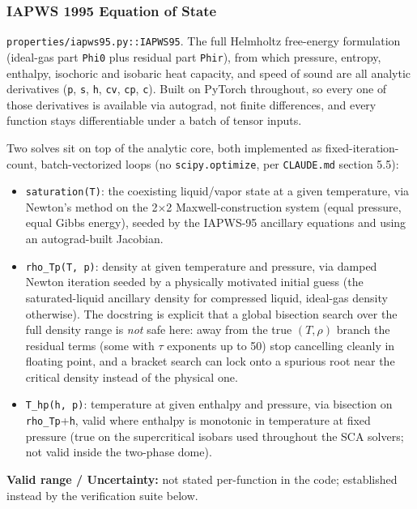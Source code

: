 \documentclass[11pt]{article}
\newcommand{\code}[1]{\texttt{#1}}
\begin{document}
\subsubsection{IAPWS 1995 Equation of State}

\code{properties/iapws95.py::IAPWS95}. The full Helmholtz free-energy formulation
(ideal-gas part \code{Phi0} plus residual part \code{Phir}), from which pressure,
entropy, enthalpy, isochoric and isobaric heat capacity, and speed of sound are all
analytic derivatives (\code{p}, \code{s}, \code{h}, \code{cv}, \code{cp}, \code{c}).
Built on PyTorch throughout, so every one of those derivatives is available via
autograd, not finite differences, and every function stays differentiable under a
batch of tensor inputs.

Two solves sit on top of the analytic core, both implemented as fixed-iteration-count,
batch-vectorized loops (no \code{scipy.optimize}, per \code{CLAUDE.md} section 5.5):
\begin{itemize}
  \item \code{saturation(T)}: the coexisting liquid/vapor state at a given temperature,
    via Newton's method on the 2$\times$2 Maxwell-construction system (equal pressure,
    equal Gibbs energy), seeded by the IAPWS-95 ancillary equations and using an
    autograd-built Jacobian.
  \item \code{rho\_Tp(T, p)}: density at given temperature and pressure, via damped
    Newton iteration seeded by a physically motivated initial guess (the saturated-liquid
    ancillary density for compressed liquid, ideal-gas density otherwise). The
    docstring is explicit that a global bisection search over the full density range is
    \emph{not} safe here: away from the true $(T,\rho)$ branch the residual terms (some
    with $\tau$ exponents up to 50) stop cancelling cleanly in floating point, and a
    bracket search can lock onto a spurious root near the critical density instead of
    the physical one.
  \item \code{T\_hp(h, p)}: temperature at given enthalpy and pressure, via bisection on
    \code{rho\_Tp}+\code{h}, valid where enthalpy is monotonic in temperature at fixed
    pressure (true on the supercritical isobars used throughout the SCA solvers; not
    valid inside the two-phase dome).
\end{itemize}

\textbf{Valid range / Uncertainty:} not stated per-function in the code; established
instead by the verification suite below.
\end{document}
